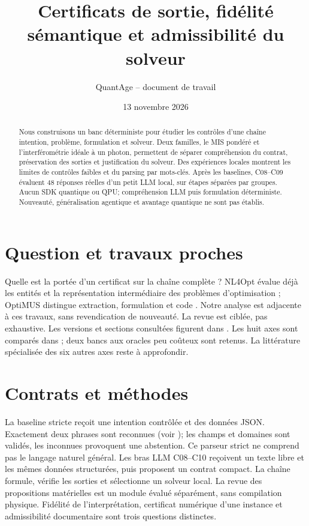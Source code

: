 \documentclass{article}
\title{Certificats de sortie, fidélité sémantique et admissibilité du solveur}
\author{QuantAge -- document de travail}
\date{13 novembre 2026}
\begin{document}
\maketitle
\begin{abstract}
Nous construisons un banc déterministe pour étudier les contrôles d'une chaîne
intention, problème, formulation et solveur. Deux familles, le MIS pondéré et
l'interférométrie idéale à un photon, permettent de séparer compréhension du
contrat, préservation des sorties et justification du solveur. Des expériences
locales montrent les limites de contrôles faibles et du parsing par mots-clés.
Après les baselines, C08--C09 évaluent 48 réponses réelles d'un petit LLM local, sur étapes séparées par groupes. Aucun SDK quantique ou QPU; compréhension LLM puis formulation déterministe. Nouveauté, généralisation agentique
et avantage quantique ne sont pas établis.
\end{abstract}

\section{Question et travaux proches}
Quelle est la portée d'un certificat sur la chaîne complète ?
NL4Opt évalue déjà les entités et la représentation intermédiaire des problèmes
d'optimisation \cite{nl4opt}; OptiMUS distingue extraction, formulation et code
\cite{optimus}. Notre analyse est adjacente à ces travaux, sans revendication
de nouveauté. La revue est ciblée, pas exhaustive. Les versions et sections
consultées figurent dans .
Les huit axes sont comparés dans ;
deux bancs aux oracles peu coûteux sont retenus. La littérature spécialisée
des six autres axes reste à approfondir.

\section{Contrats et méthodes}
La baseline stricte reçoit une intention contrôlée et des données JSON.
Exactement deux phrases sont reconnues (voir );
les champs et domaines sont validés, les inconnues provoquent une abstention.
Ce parseur strict ne comprend pas le langage naturel général.
Les bras LLM C08--C10 reçoivent un texte libre et les mêmes données
structurées, puis proposent un contrat compact.
La chaîne formule, vérifie les sorties et sélectionne un solveur local.
La revue des propositions matérielles est un module évalué séparément,
sans compilation physique. Fidélité de l'interprétation, certificat numérique
d'une instance et admissibilité documentaire sont trois questions distinctes.
\end{document}
